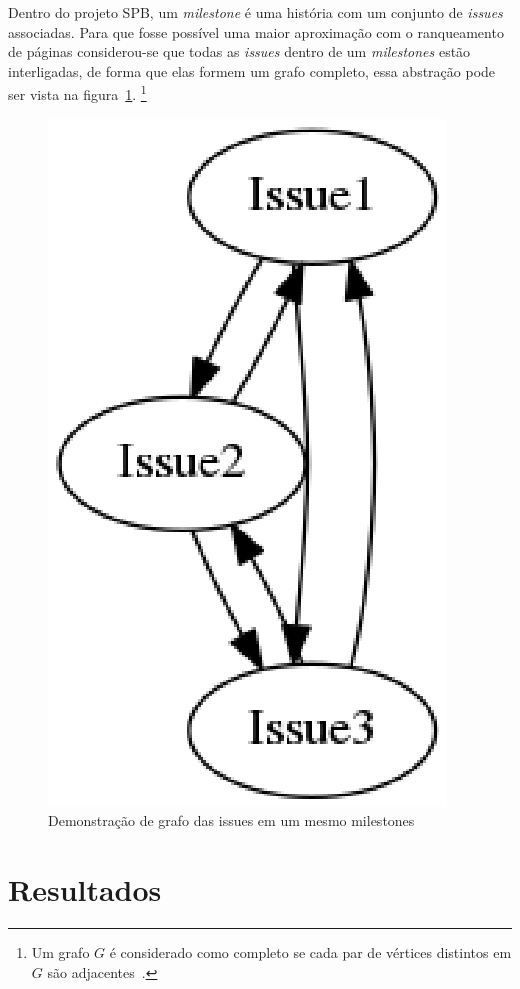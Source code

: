 Dentro do projeto SPB, um \textit{milestone} é uma história com um conjunto de 
\textit{issues} associadas. Para que fosse possível uma maior aproximação com
o ranqueamento de páginas considerou-se que todas as \textit{issues} dentro de
um \textit{milestones} estão interligadas, de forma que elas formem um grafo completo,
essa abstração pode ser vista na figura~\ref{fig:milestone-graph}.
\footnote{Um grafo $G$ é considerado como completo se cada par de vértices distintos em $G$
são adjacentes~\cite{bang}.}

\newpage
\begin{figure}[h]
    \centering
        \includegraphics[keepaspectratio=true,scale=0.5]{figuras/milestone-graph.eps}
    \caption{Demonstração de grafo das issues em um mesmo  milestones}
    \label{fig:milestone-graph}
\end{figure}

\section{Resultados}
\label{est:res}


